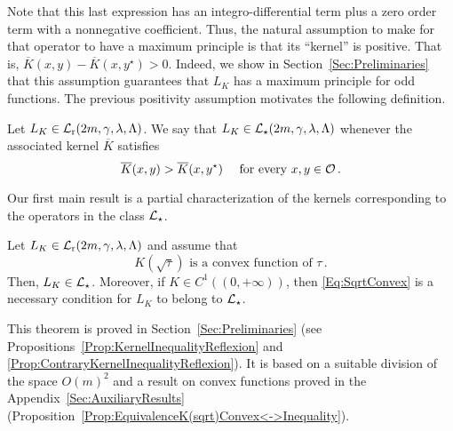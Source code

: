 Note that this last expression has an integro-differential term plus a zero order term with a nonnegative coefficient. Thus, the natural assumption to make for that operator to have a maximum principle is that its ``kernel'' is positive. That is, $\overline{K}(x, y) - \overline{K}(x, y^\star)>0$. Indeed, we show in Section~\ref{Sec:Preliminaries} that this assumption guarantees that $L_K$ has a maximum principle for odd functions. The previous positivity assumption motivates the following definition.

\begin{definition}
	Let $L_K \in \mathcal{L}_{\mathrm{r}}(2m,\gamma,\lambda, \Lambda)$. We say that $L_K\in \mathcal{L}_\star (2m,\gamma,\lambda, \Lambda)$ whenever the associated kernel $\overline{K}$ satisfies
	\begin{equation}
	\label{Eq:KernelInequality}
	\overline{K}(x,y) > \overline{K}(x, y^\star) \quad \text{ for every }x,y \in \mathcal{O}\,.
	\end{equation}
\end{definition}

Our first main result is a partial characterization of the kernels corresponding to the operators in the class $\mathcal{L}_\star$.

\begin{theorem}
	\label{Th:CharacterizationLstar}
	Let $L_K \in \mathcal{L}_{\mathrm{r}}(2m,\gamma,\lambda, \Lambda)$ and assume that 
	\begin{equation}
	\label{Eq:SqrtConvex}	
	K(\sqrt{\tau}) \text{ is a convex function of }\tau\,.
	\end{equation}
	Then, $L_K\in \mathcal{L}_\star$. Moreover, if $K\in C^1((0,+\infty))$, then \eqref{Eq:SqrtConvex} is a necessary condition for $L_K$ to belong to $\mathcal{L}_\star$.
\end{theorem}

This theorem is proved in Section~\ref{Sec:Preliminaries} (see Propositions~\ref{Prop:KernelInequalityReflexion} and \ref{Prop:ContraryKernelInequalityReflexion}). It is based on a suitable division of the space $O(m)^2$ and a result on convex functions proved in the Appendix~\ref{Sec:AuxiliaryResults} (Proposition~\ref{Prop:EquivalenceK(sqrt)Convex<->Inequality}).




